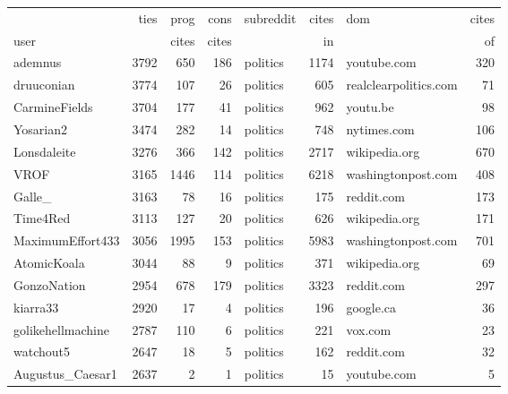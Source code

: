 \begin{tabular}{lrrrlrlr}
\toprule
{} & ties & prog & cons & subreddit & cites & dom & cites \\
user & & cites & cites & & in & & of \\
\midrule
ademnus           &  3792 &         650 &         186 &         politics &      1174 &            youtube.com &       320 \\
druuconian        &  3774 &         107 &          26 &         politics &       605 &  realclearpolitics.com &        71 \\
CarmineFields     &  3704 &         177 &          41 &         politics &       962 &               youtu.be &        98 \\
Yosarian2         &  3474 &         282 &          14 &         politics &       748 &            nytimes.com &       106 \\
Lonsdaleite       &  3276 &         366 &         142 &         politics &      2717 &          wikipedia.org &       670 \\
VROF              &  3165 &        1446 &         114 &         politics &      6218 &     washingtonpost.com &       408 \\
Galle\_            &  3163 &          78 &          16 &         politics &       175 &             reddit.com &       173 \\
Time4Red          &  3113 &         127 &          20 &         politics &       626 &          wikipedia.org &       171 \\
MaximumEffort433  &  3056 &        1995 &         153 &         politics &      5983 &     washingtonpost.com &       701 \\
AtomicKoala       &  3044 &          88 &           9 &         politics &       371 &          wikipedia.org &        69 \\
GonzoNation       &  2954 &         678 &         179 &         politics &      3323 &             reddit.com &       297 \\
kiarra33          &  2920 &          17 &           4 &         politics &       196 &              google.ca &        36 \\
golikehellmachine &  2787 &         110 &           6 &         politics &       221 &                vox.com &        23 \\
watchout5         &  2647 &          18 &           5 &         politics &       162 &             reddit.com &        32 \\
Augustus\_Caesar1  &  2637 &           2 &           1 &         politics &        15 &            youtube.com &         5 \\

\end{tabular}
